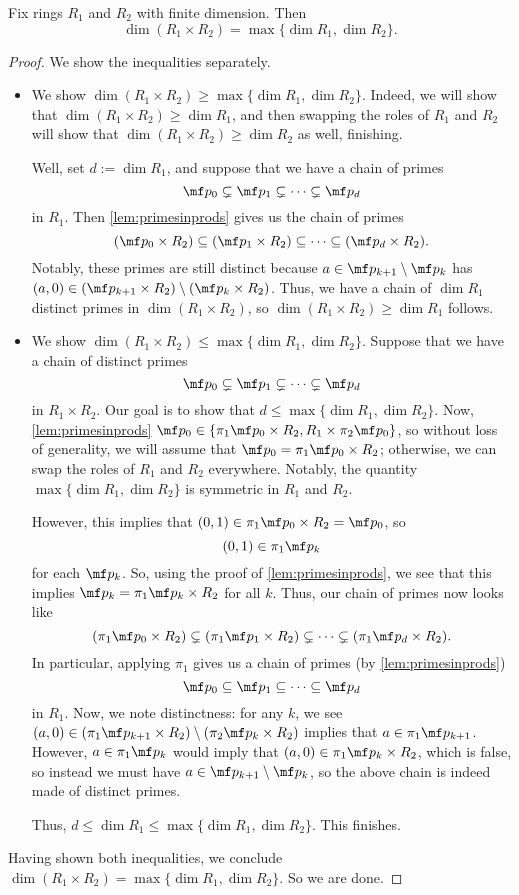 \begin{corollary} \label{cor:dimofprods}
	Fix rings $R_1$ and $R_2$ with finite dimension. Then
	\[\dim(R_1\times R_2)=\max\{\dim R_1,\dim R_2\}.\]
\end{corollary}
\begin{proof}
	We show the inequalities separately.
	\begin{itemize}
		\item We show $\dim(R_1\times R_2)\ge\max\{\dim R_1,\dim R_2\}$. Indeed, we will show that $\dim(R_1\times R_2)\ge\dim R_1$, and then swapping the roles of $R_1$ and $R_2$ will show that $\dim(R_1\times R_2)\ge\dim R_2$ as well, finishing.

		Well, set $d:=\dim R_1$, and suppose that we have a chain of primes
		\[\mf p_0\subsetneq\mf p_1\subsetneq\cdots\subsetneq\mf p_d\]
		in $R_1$. Then \autoref{lem:primesinprods} gives us the chain of primes
		\[(\mf p_0\times R_2)\subseteq(\mf p_1\times R_2)\subseteq\cdots\subseteq(\mf p_d\times R_2).\]
		Notably, these primes are still distinct because $a\in\mf p_{k+1}\setminus\mf p_k$ has $(a,0)\in(\mf p_{k+1}\times R_2)\setminus(\mf p_k\times R_2)$. Thus, we have a chain of $\dim R_1$ distinct primes in $\dim(R_1\times R_2)$, so $\dim(R_1\times R_2)\ge\dim R_1$ follows.
		
		\item We show $\dim(R_1\times R_2)\le\max\{\dim R_1,\dim R_2\}$. Suppose that we have a chain of distinct primes
		\[\mf p_0\subsetneq\mf p_1\subsetneq\cdots\subsetneq\mf p_d\]
		in $R_1\times R_2$. Our goal is to show that $d\le\max\{\dim R_1,\dim R_2\}$. Now, \autoref{lem:primesinprods} $\mf p_0\in\{\pi_1\mf p_0\times R_2,R_1\times\pi_2\mf p_0\}$, so without loss of generality, we will assume that $\mf p_0=\pi_1\mf p_0\times R_2$; otherwise, we can swap the roles of $R_1$ and $R_2$ everywhere. Notably, the quantity $\max\{\dim R_1,\dim R_2\}$ is symmetric in $R_1$ and $R_2$.

		However, this implies that $(0,1)\in\pi_1\mf p_0\times R_2=\mf p_0$, so
		\[(0,1)\in\pi_1\mf p_k\]
		for each $\mf p_k$. So, using the proof of \autoref{lem:primesinprods}, we see that this implies $\mf p_k=\pi_1\mf p_k\times R_2$ for all $k$. Thus, our chain of primes now looks like
		\[(\pi_1\mf p_0\times R_2)\subsetneq(\pi_1\mf p_1\times R_2)\subsetneq\cdots\subsetneq(\pi_1\mf p_d\times R_2).\]
		In particular, applying $\pi_1$ gives us a chain of primes (by \autoref{lem:primesinprods})
		\[\mf p_0\subseteq\mf p_1\subseteq\cdots\subseteq\mf p_d\]
		in $R_1$. Now, we note distinctness: for any $k$, we see $(a,0)\in(\pi_1\mf p_{k+1}\times R_2)\setminus(\pi_2\mf p_k\times R_2)$ implies that $a\in\pi_1\mf p_{k+1}$. However, $a\in\pi_1\mf p_k$ would imply that $(a,0)\in\pi_1\mf p_k\times R_2$, which is false, so instead we must have $a\in\mf p_{k+1}\setminus\mf p_k$, so the above chain is indeed made of distinct primes.

		Thus, $d\le\dim R_1\le\max\{\dim R_1,\dim R_2\}$. This finishes.
	\end{itemize}
	Having shown both inequalities, we conclude $\dim(R_1\times R_2)=\max\{\dim R_1,\dim R_2\}$. So we are done.
\end{proof}
